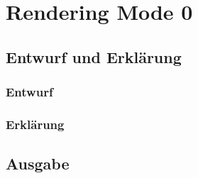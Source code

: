 \chapter{Rendering Mode 0}
\section{Entwurf und Erklärung}
\subsection{Entwurf}
\subsection{Erklärung}
\section{Ausgabe}



